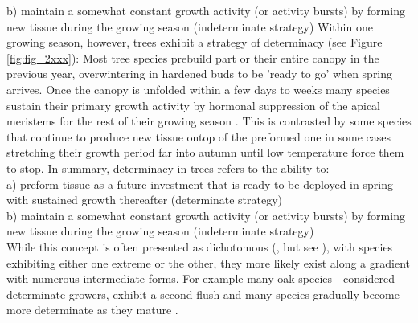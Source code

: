 \documentclass{article}
\begin{document}
b) maintain a somewhat constant growth activity (or activity bursts) by forming new tissue during the growing season (indeterminate strategy)
Within one growing season, however, trees exhibit a strategy of determinacy (see Figure \ref{fig:fig_2xxx}): Most tree species prebuild part or their entire canopy in the previous year, overwintering in hardened buds to be 'ready to go' when spring arrives. Once the canopy is unfolded within a few days to weeks many species sustain their primary growth activity by hormonal suppression of the apical meristems for the rest of their growing season \citep[paradormancy,][]{langEndoParaEcodormancy1987}. This is contrasted by some species that continue to produce new tissue ontop of the preformed one in some cases stretching their growth period far into autumn until low temperature force them to stop. In summary, determinacy in trees refers to the ability to:\\
a) preform tissue as a future investment that is ready to be deployed in spring with sustained growth thereafter (determinate strategy)\\
b) maintain a somewhat constant growth activity (or activity bursts) by forming new tissue during the growing season (indeterminate strategy)\\

While this concept is often presented as dichotomous (\cite{kozlowskiGrowthControlWoody1997, lechowiczWhyTemperateDeciduous1984a}, but see \citet{kikuzawaLeafSurvivalWoody1983}), with species exhibiting either one extreme or the other, they more likely exist along a gradient with numerous intermediate forms. For example many oak species - considered determinate growers, exhibit a second flush and many species gradually become more determinate as they mature \citep{borchertConceptJuvenilityWoody1976, heuretOntogeneticTrendsMorphological2006}.
	
\end{document}
